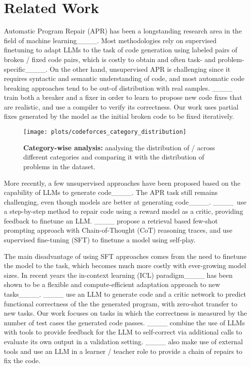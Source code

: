 \section{Related Work}
\label{sec:related_work}
Automatic Program Repair (APR) has been a longstanding research area in the field of machine learning____. Most methodologies rely on supervised finetuning to adapt LLMs to the task of code generation using labeled pairs of broken / fixed code pairs, which is costly to obtain and often task- and problem-specific____. On the other hand, unsupervised APR is challenging since it requires syntactic and semantic understanding of code, and most automatic code breaking approaches tend to be out-of distribution with real samples. ____ train both a breaker and a fixer in order to learn to propose new code fixes that are realistic, and use a compiler to verify its correctness. Our work uses partial fixes generated by the model as the initial broken code to be fixed iteratively.

\begin{figure}[t]
    \centering
    \texttt{[image: plots/codeforces\_category\_distribution]}
    \caption{\textbf{Category-wise analysis:} analysing the distribution of \aupairs/ across different categories and comparing it with the distribution of problems in the dataset.}
    \label{fig:category_analysis}
\end{figure}


More recently, a few unsupervised approaches have been proposed based on the capability of LLMs to generate code____. The APR task still remains challenging, even though models are better at generating code____. ____~use a step-by-step method to repair code using a reward model as a critic, providing feedback to finetune an LLM. ____ propose a retrieval based few-shot prompting approach with Chain-of-Thought (CoT) reasoning traces, and use supervised fine-tuning (SFT) to finetune a model using self-play.

The main disadvantage of using SFT approaches comes from the need to finetune the model to the task, which becomes much more costly with ever-growing model sizes. In recent years the in-context learning (ICL) paradigm____ has been shown to be a flexible and compute-efficient adaptation approach to new tasks____. ____ use an LLM to generate code and a critic network to predict functional correctness of the the generated program, with zero-shot transfer to new tasks. Our work focuses on tasks in which the correctness is measured by the number of test cases the generated code passes. ____ combine the use of LLMs with tools to provide feedback for the LLM to self-correct via additional calls to evaluate its own output in a validation setting. ____ also make use of external tools and use an LLM in a learner / teacher role to provide a chain of repairs to fix the code.

